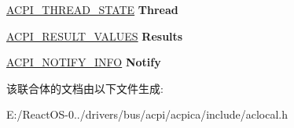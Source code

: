 \begin{DoxyCompactItemize}
\hyperlink{structacpi__thread__state}{A\+C\+P\+I\+\_\+\+T\+H\+R\+E\+A\+D\+\_\+\+S\+T\+A\+TE} {\bfseries Thread}
\item 
\mbox{\label{unionacpi__generic__state_a009d6dcd59865659823914cc5986d68f}} 
\hyperlink{structacpi__result__values}{A\+C\+P\+I\+\_\+\+R\+E\+S\+U\+L\+T\+\_\+\+V\+A\+L\+U\+ES} {\bfseries Results}
\item 
\mbox{\label{unionacpi__generic__state_a93e287c1df4628bbf18ed15a2cd07639}} 
\hyperlink{structacpi__notify__info}{A\+C\+P\+I\+\_\+\+N\+O\+T\+I\+F\+Y\+\_\+\+I\+N\+FO} {\bfseries Notify}
\end{DoxyCompactItemize}


该联合体的文档由以下文件生成\+:\begin{DoxyCompactItemize}
\item 
E\+:/\+React\+O\+S-\/0../drivers/bus/acpi/acpica/include/aclocal.\+h\end{DoxyCompactItemize}
